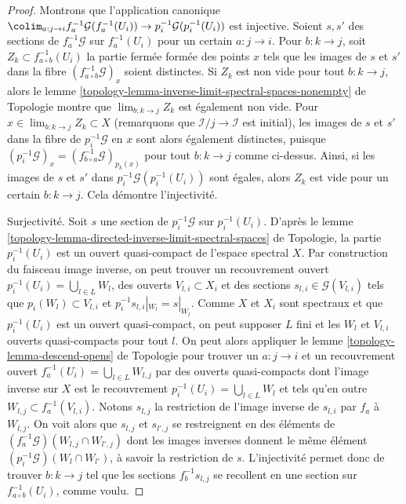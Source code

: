 \begin{proof}
Montrons que l'application canonique
$\colim_{a : j \to i} f_a^{-1}\mathcal{G}(f_a^{-1}(U_i)) \to
p_i^{-1}\mathcal{G}(p_i^{-1}(U_i))$ est injective.
Soient $s, s'$ des sections de $f_a^{-1}\mathcal{G}$
sur $f_a^{-1}(U_i)$ pour un certain $a : j \to i$. Pour
$b : k \to j$, soit $Z_k \subset f_{a \circ b}^{-1}(U_i)$
la partie fermée formée des points $x$ tels que les images de
$s$ et $s'$ dans la fibre $(f_{a \circ b}^{-1}\mathcal{G})_x$
soient distinctes. Si $Z_k$ est non vide pour tout $b : k \to j$, alors le
lemme \ref{topology-lemma-inverse-limit-spectral-spaces-nonempty} de Topologie
montre que $\lim_{b : k \to j} Z_k$ est également non vide.
Pour $x \in \lim_{b : k \to j} Z_k \subset X$
(remarquons que $\mathcal{I}/j \to \mathcal{I}$ est initial),
les images de $s$ et $s'$ dans la fibre de
$p_i^{-1}\mathcal{G}$ en $x$ sont alors également distinctes, puisque
$(p_i^{-1}\mathcal{G})_x = (f_{b \circ a}^{-1}\mathcal{G})_{p_k(x)}$
pour tout $b : k \to j$ comme ci-dessus. Ainsi, si les images de $s$ et $s'$
dans $p_i^{-1}\mathcal{G}(p_i^{-1}(U_i))$ sont égales, alors $Z_k$
est vide pour un certain $b : k \to j$. Cela démontre l'injectivité.

\medskip\noindent
Surjectivité. Soit $s$ une section de $p_i^{-1}\mathcal{G}$ sur
$p_i^{-1}(U_i)$. D'après le
lemme \ref{topology-lemma-directed-inverse-limit-spectral-spaces} de Topologie,
la partie $p_i^{-1}(U_i)$ est un ouvert quasi-compact de l'espace spectral $X$.
Par construction du faisceau image inverse, on peut trouver un recouvrement ouvert
$p_i^{-1}(U_i) = \bigcup_{l \in L} W_l$,
des ouverts $V_{l, i} \subset X_i$ et
des sections $s_{l, i} \in \mathcal{G}(V_{l, i})$
tels que $p_i(W_l) \subset V_{l, i}$ et $p_i^{-1}s_{l, i}|_{W_l} = s|_{W_l}$.
Comme $X$ et $X_i$ sont spectraux et que $p_i^{-1}(U_i)$ est un ouvert quasi-compact,
on peut supposer $L$ fini et les $W_l$ et $V_{l, i}$ ouverts quasi-compacts
pour tout $l$. On peut alors appliquer le
lemme \ref{topology-lemma-descend-opens} de Topologie
pour trouver un $a : j \to i$ et un recouvrement ouvert
$f_a^{-1}(U_i) = \bigcup_{l \in L} W_{l, j}$ par des ouverts
quasi-compacts dont l'image inverse sur $X$ est le recouvrement
$p_i^{-1}(U_i) = \bigcup_{l \in L} W_l$
et tels qu'en outre $W_{l, j} \subset f_a^{-1}(V_{l, i})$.
Notons $s_{l, j}$ la restriction de l'image inverse de $s_{l, i}$
par $f_a$ à $W_{l, j}$. On voit alors que $s_{l, j}$ et $s_{l', j}$
se restreignent en des éléments de $(f_a^{-1}\mathcal{G})(W_{l, j} \cap W_{l', j})$
dont les images inverses donnent le même élément $(p_i^{-1}\mathcal{G})(W_l \cap W_{l'})$,
à savoir la restriction de $s$. L'injectivité permet donc de trouver
$b : k \to j$ tel que les sections $f_b^{-1}s_{l, j}$
se recollent en une section sur $f_{a \circ b}^{-1}(U_i)$, comme voulu.
\end{proof}

